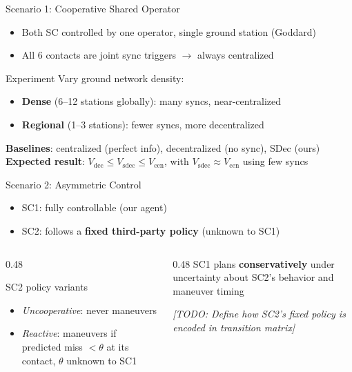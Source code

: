 \documentclass[aspectratio=169]{beamer}
\newcommand{\TODO}[1]{\textcolor{todo}{\textit{[TODO: #1]}}}
\begin{document}
\begin{frame}{Scenario 1: Cooperative Shared Operator}
  \begin{itemize}
    \item Both SC controlled by one operator, single ground station (Goddard)
    \item All 6 contacts are joint sync triggers $\rightarrow$ always centralized
  \end{itemize}
  \vspace{0.5em}
  \begin{block}{Experiment}
    Vary ground network density:
    \begin{itemize}
      \item \textbf{Dense} (6--12 stations globally): many syncs, near-centralized
      \item \textbf{Regional} (1--3 stations): fewer syncs, more decentralized
    \end{itemize}
  \end{block}
  \vspace{0.5em}
  \textbf{Baselines}: centralized (perfect info), decentralized (no sync), SDec (ours)\\[0.3em]
  \textbf{Expected result}: $V_\text{dec} \leq V_\text{sdec} \leq V_\text{cen}$, with $V_\text{sdec} \approx V_\text{cen}$ using few syncs
\end{frame}

\begin{frame}{Scenario 2: Asymmetric Control}
  \begin{itemize}
    \item SC1: fully controllable (our agent)
    \item SC2: follows a \textbf{fixed third-party policy} (unknown to SC1)
  \end{itemize}
  \vspace{0.5em}
  \begin{columns}
    \begin{column}{0.48\textwidth}
      \begin{block}{SC2 policy variants}
        \begin{itemize}
          \item \textit{Uncooperative}: never maneuvers
          \item \textit{Reactive}: maneuvers if predicted miss $< \theta$ at its contact, $\theta$ unknown to SC1
        \end{itemize}
      \end{block}
    \end{column}
    \begin{column}{0.48\textwidth}
      SC1 plans \textbf{conservatively} under uncertainty about SC2's behavior and maneuver timing
      \vspace{0.5em}

      \TODO{Define how SC2's fixed policy is encoded in transition matrix}
    \end{column}
  \end{columns}
\end{frame}
\end{document}
